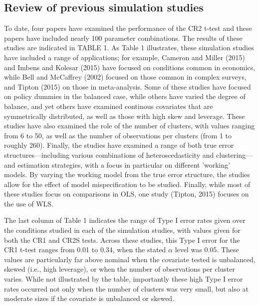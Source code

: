 \documentclass[12pt]{article}\usepackage[]{graphicx}\usepackage[]{color}
\begin{document}
\subsection{Review of previous simulation studies}

To date, four papers have examined the performance of the CR2 t-test and these papers have included nearly 100 parameter combinations. 
The results of these studies are indicated in TABLE 1. 
As Table 1 illustrates, these simulation studies have included a range of applications; for example, Cameron and Miller (2015) and Imbens and Kolesar (2015) have focused on conditions common in economics, while Bell and McCaffrey (2002) focused on those common in complex surveys, and Tipton (2015) on those in meta-analysis. 
Some of these studies have focused on policy dummies in the balanced case, while others have varied the degree of balance, and yet others have examined continous covariates that are symmetrically distributed, as well as those with high skew and leverage.
These studies have also examined the role of the number of clusters, with values ranging from 6 to 50, as well as the number of observations per clusters (from 1 to roughly 260).
Finally, the studies have examined a range of both true error structures---including various combinations of heteroscedasticity and clustering---and estimation strategies, with a focus in particular on different 'working' models. 
By varying the working model from the true error structure, the studies allow for the effect of model mispecification to be studied.
Finally, while most of these studies focus on comparisons in OLS, one study (Tipton, 2015) focuses on the use of WLS.

The last column of Table 1 indicates the range of Type I error rates given over the conditions studied in each of the simulation studies, with values given for both the CR1 and CR2S tests.
Across these studies, this Type I error for the CR1 t-test ranges from 0.01 to 0.34, when the stated $\alpha$ level was 0.05. 
These values are particularly far above nominal when the covariate tested is unbalanced, skewed (i.e., high leverage), or when the number of observations per cluster varies. 
While not illustrated by the table, importantly these high Type I error rates occurred not only when the number of clusters was very small, but also at moderate sizes if the covariate is unbalanced or skewed. 
\end{document}
